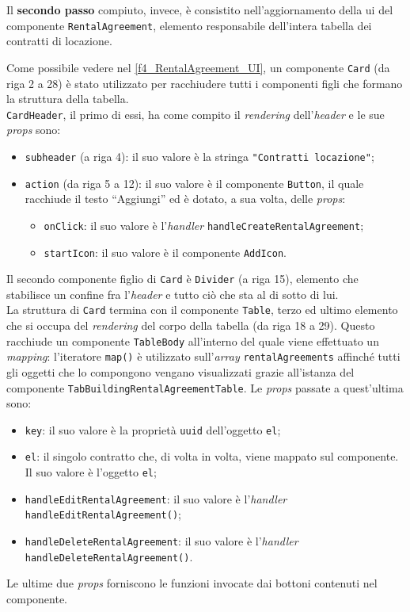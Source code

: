 Il \textbf{secondo passo} compiuto, invece, è consistito nell'aggiornamento della \acrshort{ui} del componente \texttt{RentalAgreement}, elemento responsabile dell'intera tabella dei contratti di locazione.

Come possibile vedere nel \autoref{f4_RentalAgreement_UI}, un componente \texttt{Card} (da riga 2 a 28) è stato utilizzato per racchiudere tutti i componenti figli che formano la struttura della tabella.\\
\texttt{CardHeader}, il primo di essi, ha come compito il \textit{rendering} dell'\textit{header} e le sue \textit{props} sono: 
\begin{itemize}
    \item \texttt{subheader} (a riga 4): il suo valore è la stringa \texttt{"Contratti locazione"};
    \item \texttt{action} (da riga 5 a 12): il suo valore è il componente \texttt{Button}, il quale racchiude il testo “Aggiungi” ed è dotato, a sua volta, delle \textit{props}:
        \begin{itemize}
            \item \texttt{onClick}: il suo valore è l'\textit{handler} \texttt{handleCreateRentalAgreement};
            \item \texttt{startIcon}: il suo valore è il componente \texttt{AddIcon}.
        \end{itemize}
\end{itemize}
Il secondo componente figlio di \texttt{Card} è \texttt{Divider} (a riga 15), elemento che stabilisce un confine fra l'\textit{header} e tutto ciò che sta al di sotto di lui.\\
La struttura di \texttt{Card} termina con il componente \texttt{Table}, terzo ed ultimo elemento che si occupa del \textit{rendering} del corpo della tabella (da riga 18 a 29). Questo racchiude un componente \texttt{TableBody} all'interno del quale viene effettuato un \textit{mapping}: l'iteratore \texttt{map()} è utilizzato sull'\textit{array} \texttt{rentalAgreements} affinché tutti gli oggetti che lo compongono vengano visualizzati grazie all'istanza del componente \texttt{TabBuildingRentalAgreementTable}. Le \textit{props} passate a quest'ultima sono: 
\begin{itemize}
    \item \texttt{key}: il suo valore è la proprietà \texttt{uuid} dell'oggetto \texttt{el};
    
    \item \texttt{el}: il singolo contratto che, di volta in volta, viene mappato sul componente. Il suo valore è l'oggetto \texttt{el};
    
    \item \texttt{handleEditRentalAgreement}: il suo valore è l'\textit{handler} \texttt{handleEditRentalAgreement()};
    
    \item \texttt{handleDeleteRentalAgreement}: il suo valore è l'\textit{handler} \texttt{handleDeleteRentalAgreement()}.
\end{itemize}
Le ultime due \textit{props} forniscono le funzioni invocate dai bottoni contenuti nel componente.

